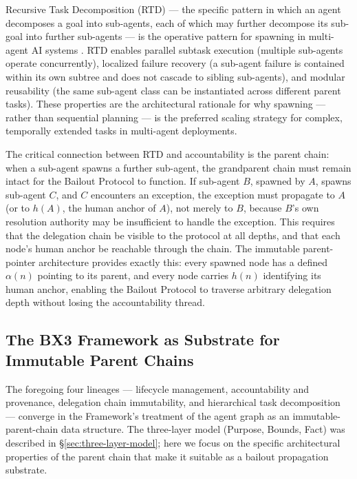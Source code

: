 Recursive Task Decomposition (RTD) — the specific pattern in which an agent decomposes a goal into sub-agents, each of which may further decompose its sub-goal into further sub-agents — is the operative pattern for spawning in multi-agent AI systems \cite{github-ai-agent-design}. RTD enables parallel subtask execution (multiple sub-agents operate concurrently), localized failure recovery (a sub-agent failure is contained within its own subtree and does not cascade to sibling sub-agents), and modular reusability (the same sub-agent class can be instantiated across different parent tasks). These properties are the architectural rationale for why spawning — rather than sequential planning — is the preferred scaling strategy for complex, temporally extended tasks in multi-agent deployments.

The critical connection between RTD and accountability is the parent chain: when a sub-agent spawns a further sub-agent, the grandparent chain must remain intact for the Bailout Protocol to function. If sub-agent $B$, spawned by $A$, spawns sub-agent $C$, and $C$ encounters an exception, the exception must propagate to $A$ (or to $h(A)$, the human anchor of $A$), not merely to $B$, because $B$'s own resolution authority may be insufficient to handle the exception. This requires that the delegation chain be visible to the protocol at all depths, and that each node's human anchor be reachable through the chain. The \bxthree{} immutable parent-pointer architecture provides exactly this: every spawned node has a defined $\alpha(n)$ pointing to its parent, and every node carries $h(n)$ identifying its human anchor, enabling the Bailout Protocol to traverse arbitrary delegation depth without losing the accountability thread.

\subsection{The BX3 Framework as Substrate for Immutable Parent Chains}
\label{sec:bx3-immutable-chains}

The foregoing four lineages — lifecycle management, accountability and provenance, delegation chain immutability, and hierarchical task decomposition — converge in the \bxthree{} Framework's treatment of the agent graph as an immutable-parent-chain data structure. The \bxthree{} three-layer model (Purpose, Bounds, Fact) was described in \S\ref{sec:three-layer-model}; here we focus on the specific architectural properties of the parent chain that make it suitable as a bailout propagation substrate.

